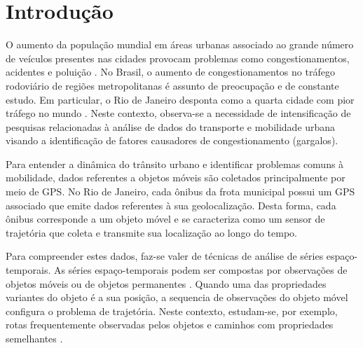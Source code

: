 \documentclass[12pt]{report} %
\begin{document}
	\listoftables
		
	\pagebreak
	
	
	\printterms[database=acronym,columns=1,prelocation=hfill,style=align]
	
	\label{lastpretextualpage}
	\pagebreak
	
	
	\justifying
	
\chapter{Introdução}
\label{sec:introducao}
O aumento da população mundial em áreas urbanas associado ao grande número de veículos presentes nas cidades provocam problemas como congestionamentos, acidentes e poluição \citep{ferreira2013visual,chen2015survey}. No Brasil, o aumento de congestionamentos no tráfego rodoviário de regiões metropolitanas é assunto de preocupação e de constante estudo. Em particular, o Rio de Janeiro desponta como a quarta cidade com pior tráfego no mundo \citep{tomtom2016traffic}. Neste contexto, observa-se a necessidade de intensificação de pesquisas relacionadas à análise de dados do transporte e mobilidade urbana visando a identificação de fatores causadores de congestionamento (gargalos).

Para entender a dinâmica do trânsito urbano e identificar problemas comuns à mobilidade, dados referentes a objetos móveis são coletados principalmente por meio de GPS. No Rio de Janeiro, cada ônibus da frota municipal possui um GPS associado que emite dados referentes à sua geolocalização. Desta forma, cada ônibus corresponde a um objeto móvel e se caracteriza como um sensor de trajetória que coleta e transmite sua localização ao longo do tempo. 

Para compreender estes dados, faz-se valer de técnicas de análise de séries espaço-temporais. As séries espaço-temporais podem ser compostas por observações de objetos móveis ou de objetos permanentes \citep{Frank:2003}. Quando uma das propriedades variantes do objeto é a sua posição, a sequencia de observações do objeto móvel configura o problema de trajetória. Neste contexto, estudam-se, por exemplo, rotas frequentemente observadas pelos objetos e caminhos com propriedades semelhantes \citep{Spaccapietra:2008}. 
\end{document}
